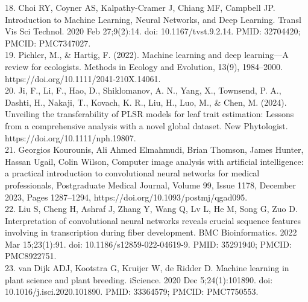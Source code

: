 \documentclass[12pt,a4paper]{report}
\begin{document}
18. Choi RY, Coyner AS, Kalpathy-Cramer J, Chiang MF, Campbell JP. Introduction to Machine Learning, Neural Networks, and Deep Learning. Transl Vis Sci Technol. 2020 Feb 27;9(2):14. doi: 10.1167/tvst.9.2.14. PMID: 32704420; PMCID: PMC7347027.\\
19. Pichler, M., & Hartig, F. (2022). Machine learning and deep learning—A review for ecologists. Methods in Ecology and Evolution, 13(9), 1984–2000. https://doi.org/10.1111/2041-210X.14061. \\
20. Ji, F., Li, F., Hao, D., Shiklomanov, A. N., Yang, X., Townsend, P. A., Dashti, H., Nakaji, T., Kovach, K. R., Liu, H., Luo, M., & Chen, M. (2024). Unveiling the transferability of PLSR models for leaf trait estimation: Lessons from a comprehensive analysis with a novel global dataset. New Phytologist. https://doi.org/10.1111/nph.19807. \\
21. Georgios Kourounis, Ali Ahmed Elmahmudi, Brian Thomson, James Hunter, Hassan Ugail, Colin Wilson, Computer image analysis with artificial intelligence: a practical introduction to convolutional neural networks for medical professionals, Postgraduate Medical Journal, Volume 99, Issue 1178, December 2023, Pages 1287–1294, https://doi.org/10.1093/postmj/qgad095. \\
22. Liu S, Cheng H, Ashraf J, Zhang Y, Wang Q, Lv L, He M, Song G, Zuo D. Interpretation of convolutional neural networks reveals crucial sequence features involving in transcription during fiber development. BMC Bioinformatics. 2022 Mar 15;23(1):91. doi: 10.1186/s12859-022-04619-9. PMID: 35291940; PMCID: PMC8922751. \\
23. van Dijk ADJ, Kootstra G, Kruijer W, de Ridder D. Machine learning in plant science and plant breeding. iScience. 2020 Dec 5;24(1):101890. doi: 10.1016/j.isci.2020.101890. PMID: 33364579; PMCID: PMC7750553. \\
\end{document}
